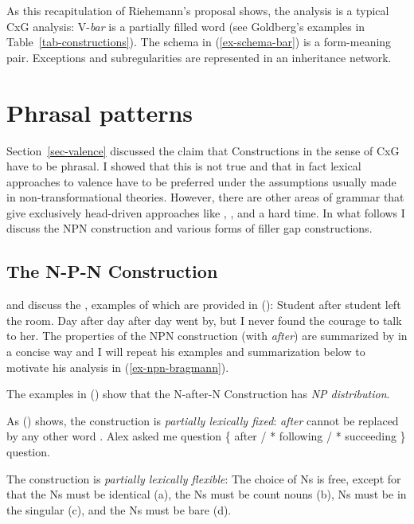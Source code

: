 \documentclass[output=paper]{langsci/langscibook}
\begin{document}
As this recapitulation of Riehemann's proposal shows, the analysis is a typical CxG analysis:
V-\emph{bar} is a partially filled word (see Goldberg's examples in
Table~\ref{tab-constructions}). The schema in (\ref{ex-schema-bar}) is a form-meaning
pair. Exceptions and subregularities are represented in an inheritance network.


\section{Phrasal patterns}
\label{sec-phrasal-patterns}
\label{sec-phrasal}

Section~\ref{sec-valence} discussed the claim that Constructions in the sense of CxG have to be phrasal. I
showed that this is not true and that in fact lexical approaches to valence have to be preferred
under the assumptions usually made in non-transformational theories. However, there are other areas
of grammar that give exclusively head-driven approaches like \cg, \minimalism, and \dg a hard
time. In what follows I discuss the NPN construction and various forms of filler gap constructions.

\subsection{The N-P-N Construction}

\citet{Matsuyama2004a} and \citet{Jackendoff2008a} discuss the , examples of
which are provided in ():
\eal
\ex Student after student left the room.
\ex
\label{ex-npn-iteration}
Day after day after day went by, but I never found the courage to talk to
her. \citep{Bargmann2015a}
\zl
The properties of the NPN construction (with \emph{after})  are summarized by \citet{Bargmann2015a}
in a concise way and I will repeat his examples and summarization below to motivate his analysis in (\ref{ex-npn-bragmann}).

The examples in () show that the N-after-N Construction has \emph{NP distribution}.

As () shows, the construction is \emph{partially lexically fixed}: \emph{after} cannot be
replaced by any other word \citep[]{Matsuyama2004a}.
\ea
Alex asked me question \{ after / * following / * succeeding \} question.
\z

The construction is \emph{partially lexically flexible}: The choice of Ns is free, except for that
the Ns must be identical (a), the Ns must be count nouns (b), Ns must be in the
singular (c), and the Ns must be bare (d).
\end{document}
